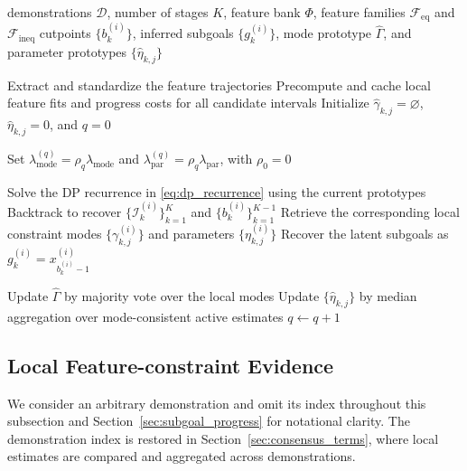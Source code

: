 \documentclass[lettersize,journal]{IEEEtran}
\begin{document}
\begin{algorithm}[t]
\caption{Stage-wise Constraint Learning from Demonstrations}
\label{alg:swcl}
\begin{algorithmic}[1]
\Require demonstrations $\mathcal{D}$, number of stages $K$,
feature bank $\Phi$, feature families
$\mathcal{F}_{\mathrm{eq}}$ and $\mathcal{F}_{\mathrm{ineq}}$
\Ensure cutpoints $\{b_k^{(i)}\}$, inferred subgoals
$\{g_k^{(i)}\}$, mode prototype $\hat{\Gamma}$,
and parameter prototypes $\{\hat{\eta}_{k,j}\}$

\State Extract and standardize the feature trajectories
\State Precompute and cache local feature fits and progress costs for all candidate intervals
\State Initialize $\hat{\gamma}_{k,j}=\varnothing$,
$\hat{\eta}_{k,j}=0$, and $q=0$

\Repeat
    \State Set
    $\lambda_{\mathrm{mode}}^{(q)}
    =\rho_q\lambda_{\mathrm{mode}}$
    and
    $\lambda_{\mathrm{par}}^{(q)}
    =\rho_q\lambda_{\mathrm{par}}$,
    with $\rho_0=0$

        \State Solve the DP recurrence in \eqref{eq:dp_recurrence} using the current prototypes
        \State Backtrack to recover
        $\{\mathcal{I}_k^{(i)}\}_{k=1}^{K}$
        and $\{b_k^{(i)}\}_{k=1}^{K-1}$
        \State Retrieve the corresponding local constraint modes
        $\{\gamma_{k,j}^{(i)}\}$ and parameters $\{\eta_{k,j}^{(i)}\}$
        \State Recover the latent subgoals as
        $g_k^{(i)}=x_{b_k^{(i)}-1}^{(i)}$
    \EndFor

    \State Update $\hat{\Gamma}$ by majority vote over the local modes
    \State Update $\{\hat{\eta}_{k,j}\}$ by median aggregation over mode-consistent active estimates
    \State $q\leftarrow q+1$
\end{algorithmic}
\end{algorithm}


\subsection{Local Feature-constraint Evidence}
\label{sec:local_constraint_evidence}

We consider an arbitrary demonstration and omit its index throughout this subsection and Section~\ref{sec:subgoal_progress} for notational clarity. The demonstration index is restored in Section~\ref{sec:consensus_terms}, where local estimates are compared and aggregated across demonstrations.
\end{document}
